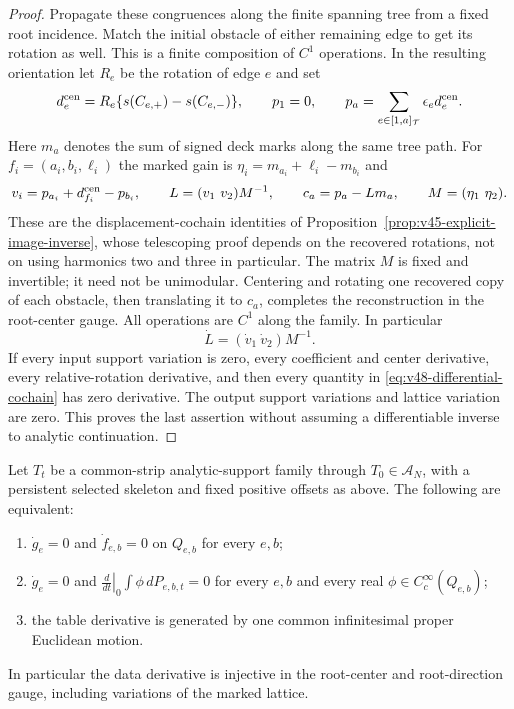 \begin{proof}
Propagate these congruences along the finite spanning tree from a fixed
root incidence.  Match the initial obstacle of either remaining edge
to get its rotation as well.  This is a finite composition of $C^1$
operations.  In the resulting orientation let $R_e$ be the rotation of
edge $e$ and set
\[
 d_e^{\rm cen}=R_e\{s(C_{e,+})-s(C_{e,-})\},\qquad
 p_1=0,\qquad p_a=\sum_{e\in[1,a]_{\mathcal T}}\epsilon_e d_e^{\rm cen}.
\]
Here $m_a$ denotes the sum of signed deck marks along the same tree
path.  For $f_i=(a_i,b_i,\ell_i)$ the marked gain is
$\eta_i=m_{a_i}+\ell_i-m_{b_i}$ and
\begin{equation}\label{eq:v48-differential-cochain}
 v_i=p_{a_i}+d_{f_i}^{\rm cen}-p_{b_i},\qquad
 L=(v_1\ v_2)M^{-1},\qquad c_a=p_a-Lm_a,
 \qquad M=(\eta_1\ \eta_2).
\end{equation}
These are the displacement-cochain identities of
Proposition~\ref{prop:v45-explicit-image-inverse}, whose telescoping
proof depends on the recovered rotations, not on using harmonics two
and three in particular.  The matrix $M$ is fixed and invertible; it
need not be unimodular.  Centering and rotating one recovered copy of
each obstacle, then translating it to $c_a$, completes the
reconstruction in the root-center gauge.  All operations are $C^1$
along the family.  In particular
\[
                  \dot L=(\dot v_1\ \dot v_2)M^{-1}.
\]
If every input support variation is zero, every coefficient and center
derivative, every relative-rotation derivative, and then every quantity
in \eqref{eq:v48-differential-cochain} has zero derivative.  The output
support variations and lattice variation are zero.  This proves the
last assertion without assuming a differentiable inverse to analytic
continuation.
\end{proof}

\begin{theorem}
\label{thm:v48-infinitesimal}
Let $T_t$ be a common-strip analytic-support family through
$T_0\in\mathscr A_N$, with a persistent selected skeleton and fixed
positive offsets as above.  The following are equivalent:
\begin{enumerate}
\item $\dot g_e=0$ and $\dot f_{e,b}=0$ on $Q_{e,b}$ for every $e,b$;
\item $\dot g_e=0$ and $\left.\frac{d}{dt}\right|_0
\int\phi\,dP_{e,b,t}=0$ for every $e,b$ and every real
$\phi\in C_c^\infty(Q_{e,b})$;
\item the table derivative is generated by one common infinitesimal
proper Euclidean motion.
\end{enumerate}
In particular the data derivative is injective in the root-center and
root-direction gauge, including variations of the marked lattice.
\end{theorem}

